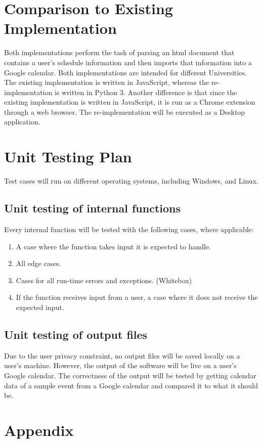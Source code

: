 \documentclass[12pt, titlepage]{article}
\begin{document}
\section{Comparison to Existing Implementation}	
Both implementations perform the task of parsing an html document that contains a user's schedule information and then imports that information into a Google calendar. Both implementations are intended for different Universities. The existing implementation is written in JavaScript, whereas the re-implementation is written in Python 3. Another difference is that since the existing implementation is written in JavaScript, it is run as a Chrome extension through a web browser. The re-implementation will be executed as a Desktop application.


\section{Unit Testing Plan}
Test cases will run on different operating systems, including Windows, and Linux.	
\subsection{Unit testing of internal functions}
Every internal function will be tested with the following cases, where applicable: 

\begin{enumerate}
\item A case where the function takes input it is expected to handle. 
\item All edge cases.
\item Cases for all run-time errors and exceptions. (Whitebox)
\item If the function receives input from a user, a case where it does not receive the expected input.
\end{enumerate}
	
\subsection{Unit testing of output files}		
Due to the user privacy constraint, no output files will be saved locally on a user's machine.
However, the output of the software will be live on a user's Google calendar. The correctness of the output will be tested by getting calendar data of a sample event from a Google calendar and compared it to what it should be. 

\newpage

\section{Appendix}
\end{document}
